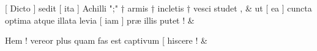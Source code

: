 \documentclass[12pt,onecolumn,twoside,a4paper]{memoir}
\begin{document}
               \begin{pairs}
                  \begin{Leftside}
			\beginnumbering
			\setcounter{stanzaL}{0}
                     
                         \stanza {}[
                              Dicto
                              ]
                              sedit
                              [
                              ita
                              ]
                              Achilli
                              ";"
                              †
                              armis
                              †
                              incletis
                              †
                              vesci
                              studet
                              , & 
                     ut
                              [
                              ea
                              ]
                              cuncta
                              optima
                              atque
                              illata
                              levia
                              [
                              iam
                              ]
                              præ
                              illis
                              putet
                              ! \&
                         \stanza {}
                     
                              Hem
                              !
                              vereor
                              plus
                              quam
                              fas
                              est
                              captivum
                              [
                              hiscere
                              ! \&
                         \stanza {}
                     

\end{Leftside}
\end{pairs}
\end{document}
